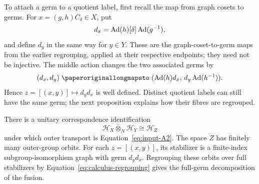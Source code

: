 To attach a germ to a quotient label, first recall the map from graph
cosets to germs.  For $x=(g,h)C_\delta\in X$, put
\[
 d_x=\operatorname{Ad}(h)[\delta]\operatorname{Ad}(g^{-1}),
\]
and define $d_y$ in the same way for $y\in Y$.  These are the
graph-coset-to-germ maps from the earlier regrouping, applied at their
respective endpoints; they need not be injective.  The middle action changes the two associated germs by
\[
 (d_x,d_y)\longmapsto
       (\Ad(h)d_x,\,d_y\Ad(h^{-1})).
\]
Hence $z=[(x,y)]\mapsto d_y d_x$ is well defined.  Distinct quotient
labels can still have the same germ; the next proposition explains how
their fibres are regrouped.

\begin{proposition}
\label{prop:calculus-fusion}
There is a unitary correspondence identification
\begin{equation}\label{eq:calculus-fusion-unitary}
 \mathcal H_X\mathbin{\bar\otimes}_{N}\mathcal H_Y
 \cong\mathcal H_Z
\end{equation}
under which outer transport is Equation~\eqref{eq:input-A2}.
The space $Z$ has finitely many outer-group orbits.  For each
$z=[(x,y)]$, its stabilizer is a finite-index subgroup-isomorphism
graph with germ $d_y d_x$.
Regrouping these orbits over full stabilizers by
Equation~\eqref{eq:calculus-regrouping} gives the full-germ
decomposition of the fusion.
\end{proposition}

